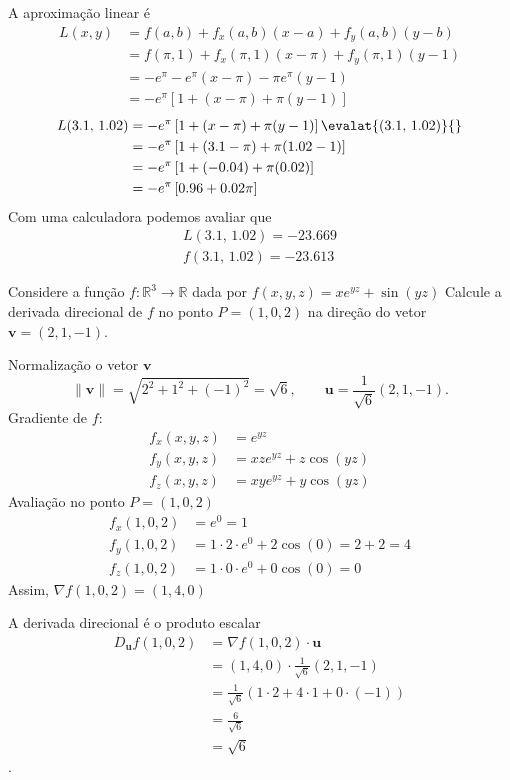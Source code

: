\documentclass[a4paper,12pt,fleqn]{article}
\begin{document}
\begin{answer}
A aproximação linear é
\begin{align*}
  L(x, y)
  & = f(a, b) + f_x(a, b)(x-a) + f_y(a, b)(y-b) \\
  & = f(\pi, 1) + f_x(\pi, 1)(x-\pi) + f_y(\pi, 1)(y-1) \\
  & = -e^\pi - e^\pi(x-\pi) - \pi e^\pi (y-1) \\
  & = -e^\pi \left[ 1 + (x-\pi) + \pi (y-1)\right]
\end{align*}
\begin{align*}
  L(3.1,\,1.02)
  & = -e^\pi \left[ 1 + (x-\pi) + \pi (y-1)\right] \evalat{(3.1,\,1.02)}{} \\
  & = -e^\pi \left[ 1 + (3.1-\pi) + \pi (1.02-1)\right] \\
  & = -e^\pi \left[ 1 + (-0.04) + \pi (0.02)\right] \\
  & = -e^\pi \left[ 0.96 + 0.02\pi \right]
\end{align*}
Com uma calculadora podemos avaliar que
\begin{align*}
  L(3.1,\,1.02) = -23.669 \\
  f(3.1,\,1.02) = -23.613
\end{align*}
\end{answer}

Considere a função \(f:\mathbb{R}^3\to\mathbb{R}\) dada por
\(
  f(x, y, z) = x e^{yz} + \sin(yz)
\)
Calcule a derivada direcional de \(f\) no ponto \(P = (1, 0, 2)\) na direção do vetor
\(\mathbf{v}=(2, 1, -1)\).

\begin{answer}
Normalização o vetor \(\mathbf{v}\)
\[
  \|\mathbf{v}\| = \sqrt{2^2+1^2+(-1)^2}=\sqrt{6},
  \qquad
  \mathbf{u} = \frac{1}{\sqrt{6}}(2, 1, -1).
\]
Gradiente de \(f\):
\begin{align*}
  f_x(x, y, z) & = e^{yz}                \\
  f_y(x, y, z) & = xz e^{yz} + z\cos(yz) \\
  f_z(x, y, z) & = xy e^{yz} + y\cos(yz)
\end{align*}
Avaliação no ponto \(P=(1,0,2)\)
\begin{align*}
f_x(1, 0, 2) & = e^{0} = 1 \\
f_y(1, 0, 2) & = 1 \cdot 2 \cdot e^{0} + 2\cos(0) = 2+2 = 4 \\
f_z(1, 0, 2) & = 1 \cdot 0 \cdot e^{0} + 0\cos(0) = 0
\end{align*}
Assim,
\(
  \nabla f(1, 0, 2) = (1, 4, 0)
\)

A derivada direcional é o produto escalar
\begin{align*}
  D_{\mathbf{u}}f(1, 0, 2)
  & = \nabla f(1, 0, 2)\cdot \mathbf{u} \\
  & = (1, 4, 0)\cdot \frac{1}{\sqrt{6}}(2, 1, -1) \\
  & = \frac{1}{\sqrt{6}}(1\cdot 2 + 4\cdot 1 + 0\cdot (-1)) \\
  & = \frac{6}{\sqrt{6}} \\
  & = \sqrt{6}
\end{align*}.
\end{answer}

\end{document}
